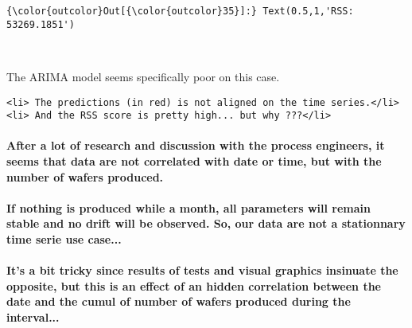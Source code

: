 \documentclass[11pt]{article}
\begin{document}
\begin{Verbatim}[commandchars=\\\{\}]
{\color{outcolor}Out[{\color{outcolor}35}]:} Text(0.5,1,'RSS: 53269.1851')
\end{Verbatim}
            
    \begin{center}
    \end{center}
    { \hspace*{\fill} \\}
    
    The ARIMA model seems specifically poor on this case.

\begin{verbatim}
<li> The predictions (in red) is not aligned on the time series.</li>
<li> And the RSS score is pretty high... but why ???</li>
\end{verbatim}

\paragraph{After a lot of research and discussion with the process
engineers, it seems that data are not correlated with date or time, but
with the number of wafers
produced.}\label{after-a-lot-of-research-and-discussion-with-the-process-engineers-it-seems-that-data-are-not-correlated-with-date-or-time-but-with-the-number-of-wafers-produced.}

\paragraph{If nothing is produced while a month, all parameters will
remain stable and no drift will be observed. So, our data are not a
stationnary time serie use
case...}\label{if-nothing-is-produced-while-a-month-all-parameters-will-remain-stable-and-no-drift-will-be-observed.-so-our-data-are-not-a-stationnary-time-serie-use-case...}

\paragraph{It's a bit tricky since results of tests and visual graphics
insinuate the opposite, but this is an effect of an hidden correlation
between the date and the cumul of number of wafers produced during the
interval...}\label{its-a-bit-tricky-since-results-of-tests-and-visual-graphics-insinuate-the-opposite-but-this-is-an-effect-of-an-hidden-correlation-between-the-date-and-the-cumul-of-number-of-wafers-produced-during-the-interval...}
\end{document}
